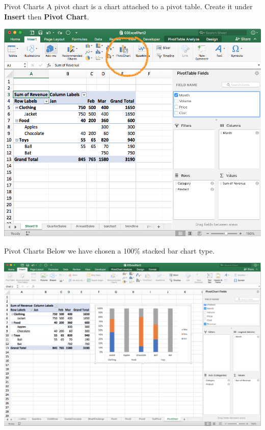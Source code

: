 \documentclass[xcolor=svgnames]{beamer}
\begin{document}
\begin{frame}{Pivot Charts}
A pivot chart is a chart attached to a pivot table.  Create it under {\bf Insert} then {\bf Pivot Chart}.
\begin{center}
\includegraphics[width=.9\textwidth]{pivChart.png}
\end{center}
\end{frame}


\begin{frame}{Pivot Charts}
Below we have chosen a 100\% stacked bar chart type.
\begin{center}
\includegraphics[width=.9\textwidth]{pivChart2.png}
\end{center}
\end{frame}
\end{document}
